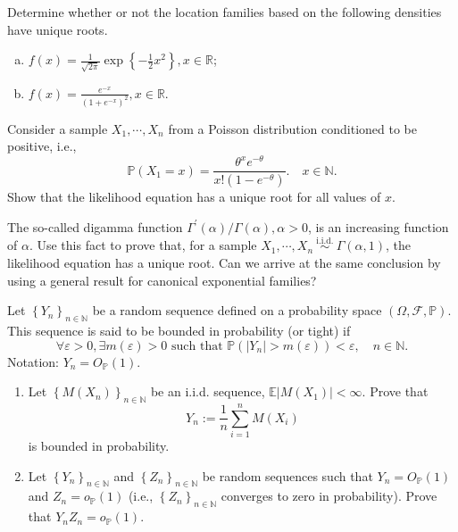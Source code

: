 \begin{ex}
    Determine whether or not the location families based on the following densities have unique roots. 
    \begin{enumerate}[(a)]
        \item \(f(x)=\frac{1}{\sqrt{2 \pi}} \exp \left\{-\frac{1}{2} x^{2}\right\}, x \in \mathbb{R}\); 
        \item \(f(x)=\frac{e^{-x}}{\left(1+e^{-x}\right)^{2}}, x \in \mathbb{R}\). 
    \end{enumerate}
\end{ex}

\begin{ex}
    Consider a sample \(X_{1}, \cdots, X_{n}\) from a Poisson distribution conditioned to be positive, i.e.,
    \[
        \mathbb{P}\left(X_{1}=x\right)=\frac{\theta^{x} e^{-\theta}}{x !\left(1-e^{-\theta}\right)} . \quad x \in \mathbb{N} .
    \]
    Show that the likelihood equation has a unique root for all values of \(x\). 
\end{ex}


\begin{ex}
    The so-called digamma function \(\Gamma^{\prime}(\alpha) / \Gamma(\alpha), \alpha>0\), is an increasing function of \(\alpha\). Use this fact to prove that, for a sample \(X_{1}, \cdots, X_{n} \stackrel{\text { i.i.d. }}{\sim} \Gamma(\alpha, 1)\), the likelihood equation has a unique root. Can we arrive at the same conclusion by using a general result for canonical exponential families?
\end{ex}

\begin{ex}
    Let \(\left\{Y_{n}\right\}_{n \in \mathbb{N}}\) be a random sequence defined on a probability space \((\Omega, \mathcal{F}, \mathbb{P})\). This sequence is said to be bounded in probability (or tight) if
    \[
        \forall \varepsilon>0, \exists m(\varepsilon)>0 \text { such that } \mathbb{P}\left(\left|Y_{n}\right|>m(\varepsilon)\right)<\varepsilon, \quad n \in \mathbb{N} .
    \]
    Notation: \(Y_{n}=O_{\mathbb{P}}(1)\). 
    \begin{enumerate}
        \item Let \(\left\{M\left(X_{n}\right)\right\}_{n \in \mathbb{N}}\) be an i.i.d. sequence, \(\mathbb{E}\left|M\left(X_{1}\right)\right|<\infty\). Prove that
        \[
        Y_{n}:=\frac{1}{n} \sum_{i=1}^{n} M\left(X_{i}\right)
        \]
        is bounded in probability. 
        \item Let \(\left\{Y_{n}\right\}_{n \in \mathbb{N}}\) and \(\left\{Z_{n}\right\}_{n \in \mathbb{N}}\) be random sequences such that \(Y_{n}=O_{\mathbb{P}}(1)\) and \(Z_{n}=o_{\mathbb{P}}(1)\) (i.e., \(\left\{Z_{n}\right\}_{n \in \mathbb{N}}\) converges to zero in probability). Prove that \(Y_{n} Z_{n}=o_{\mathbb{P}}(1)\). 
    \end{enumerate}
\end{ex}


